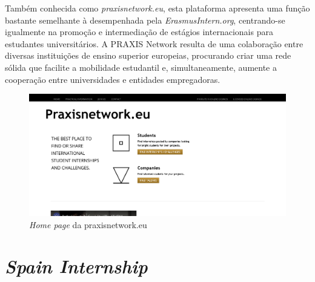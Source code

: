 Também conhecida como \textit{praxisnetwork.eu}, esta plataforma apresenta uma função bastante semelhante à desempenhada pela \textit{ErasmusIntern.org}, centrando-se igualmente na promoção e intermediação de estágios internacionais para estudantes universitários. A PRAXIS Network resulta de uma colaboração entre diversas instituições de ensino superior europeias, procurando criar uma rede sólida que facilite a mobilidade estudantil e, simultaneamente, aumente a cooperação entre universidades e entidades empregadoras.

\begin{figure}[h!tbp]
    \centering
    \includegraphics[width=\linewidth]{capitulos/cap2-estadodaarte/assets/image/praxis/praxis-home-page.png}
    \caption{\textit{Home page} da praxisnetwork.eu}
    \label{fig:erasmus-intern-org}
\end{figure}

\section{\textit{Spain Internship}}